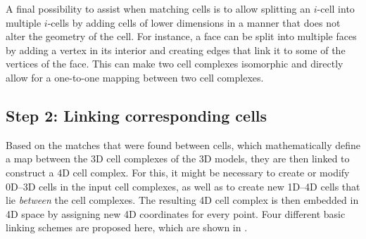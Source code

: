 A final possibility to assist when matching cells is to allow splitting an $i$-cell into multiple $i$-cells by adding cells of lower dimensions in a manner that does not alter the geometry of the cell.
For instance, a face can be split into multiple faces by adding a vertex in its interior and creating edges that link it to some of the vertices of the face.
This can make two cell complexes isomorphic and directly allow for a one-to-one mapping between two cell complexes.


\subsection{Step 2: Linking corresponding cells}
\label{ss:linkingrules}

Based on the matches that were found between cells, which mathematically define a map between the 3D cell complexes of the 3D models, they are then linked to construct a 4D cell complex.
For this, it might be necessary to create or modify 0D--3D cells in the input cell complexes, as well as to create new 1D--4D cells that lie \emph{between} the cell complexes.
The resulting 4D cell complex is then embedded in 4D space by assigning new 4D coordinates for every point.
Four different basic linking schemes are proposed here, which are shown in .
